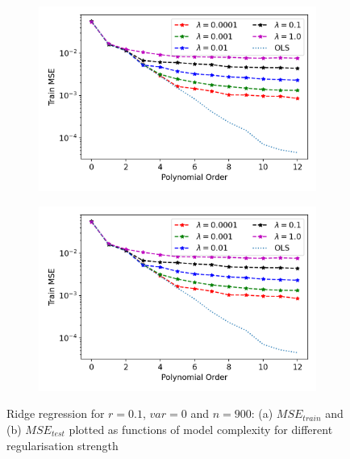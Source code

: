 \begin{figure}[htb]
\centering
\begin{subfigure}{.5\textwidth}
  \centering
  \includegraphics[width=.9\linewidth]{Images/ridge7b.png}
  \caption{}
  \label{fig:ridge7}
\end{subfigure}%
\begin{subfigure}{.5\textwidth}
  \centering
  \includegraphics[width=.9\linewidth]{Images/ridge7b.png}
  \caption{}
  \label{fig:ridge7b}
\end{subfigure}
\caption{Ridge regression for $r=0.1$, $var=0$ and $n=900$: (a) $MSE_{train}$ and (b) $MSE_{test}$ plotted as functions of model complexity for different regularisation strength}
\label{fig:Ridge1}
\end{figure}

